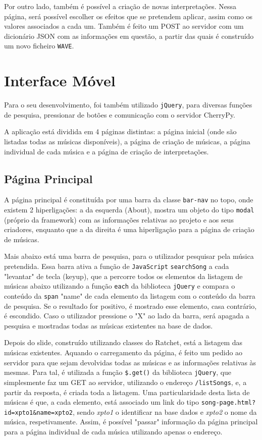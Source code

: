 \documentclass[a4paper,11pt,openright,oneside]{report}
\begin{document}
Por outro lado, também é possível a criação de novas interpretações. Nessa página, será possível escolher os efeitos que se pretendem aplicar, assim como os valores associados a cada um. Também é feito um POST ao servidor com um dicionário JSON com as informações em questão, a partir das quais é construído um novo ficheiro \verb|WAVE|.

\section{Interface Móvel}
\label{sec.mobile}
Para o seu desenvolvimento, foi também utilizado \verb|jQuery|, para diversas funções de pesquisa, pressionar de botões e comunicação com o servidor CherryPy.

A aplicação está dividida em 4 páginas distintas: a página inicial (onde são listadas todas as músicas disponíveis), a página de criação de músicas, a página individual de cada música e a página de criação de interpretações.

\subsection{Página Principal}
\label{sec.mobile.index}

A página principal é constituída por uma barra da classe \texttt{bar-nav} no topo, onde existem 2 hiperligações: a da esquerda (About), mostra um objeto do tipo \texttt{modal} (próprio da framework) com as informações relativas ao projeto e aos seus criadores, enquanto que a da direita é uma hiperligação para a página de criação de músicas.

Mais abaixo está uma barra de pesquisa, para o utilizador pesquisar pela música pretendida. Essa barra ativa a função de \verb|JavaScript| \texttt{searchSong} a cada "levantar" de tecla (keyup), que a percorre todos os elementos da listagem de músicas abaixo utilizando a função \texttt{each} da biblioteca \verb|jQuery| e compara o conteúdo da \texttt{span} "name" de cada elemento da listagem com o conteúdo da barra de pesquisa. Se o resultado for positivo, é mostrado esse elemento, casa contrário, é escondido. Caso o utilizador pressione o "X" ao lado da barra, será apagada a pesquisa e mostradas todas as músicas existentes na base de dados.

Depois do slide, construído utilizando classes do Ratchet, está a listagem das músicas existentes. Aquando o carregamento da página, é feito um pedido ao servidor para que sejam devolvidas todas as músicas e as informações relativas às mesmas. Para tal, é utilizada a função \texttt{\$.get()} da biblioteca \verb|jQuery|, que simplesmente faz um GET ao servidor, utilizando o endereço \texttt{/listSongs}, e, a partir da resposta, é criada toda a listagem. Uma particularidade desta lista de músicas é que, a cada elemento, está associado um link do tipo \texttt{song-page.html?id=xpto1\&name=xpto2}, sendo \textit{xpto1} o identificar na base dados e \textit{xpto2} o nome da música, respetivamente. Assim, é possível "passar" informação da página principal para a página individual de cada música utilizando apenas o endereço.
\end{document}

